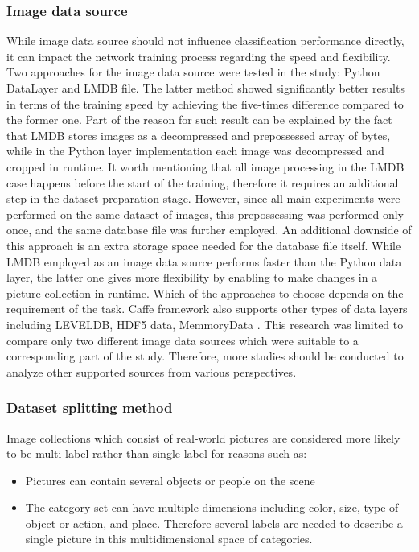 \subsubsection{Image data source}
While image data source should not influence classification performance directly, it can impact the network training process regarding the speed and flexibility. Two approaches for the image data source were tested in the study: Python DataLayer and LMDB file. The latter method showed significantly better results in terms of the training speed by achieving the five-times difference compared to the former one. Part of the reason for such result can be explained by the fact that LMDB stores images as a decompressed and prepossessed array of bytes, while in the Python layer implementation each image was decompressed and cropped in runtime. It worth mentioning that all image processing in the LMDB case happens before the start of the training, therefore it requires an additional step in the dataset preparation stage. However, since all main experiments were performed on the same dataset of images, this prepossessing was performed only once, and the same database file was further employed. An additional downside of this approach is an extra storage space needed for the database file itself. While LMDB employed as an image data source performs faster than the Python data layer, the latter one gives more flexibility by enabling to make changes in a picture collection in runtime. Which of the approaches to choose depends on the requirement of the task. Caffe framework also supports other types of data layers including LEVELDB, HDF5 data, MemmoryData \cite{CaffeLayerCatalogue}. This research was limited to compare only two different image data sources which were suitable to a corresponding part of the study. Therefore, more studies should be conducted to analyze other supported sources from various perspectives.

\subsubsection{Dataset splitting method}
Image collections which consist of real-world pictures are considered more likely to be multi-label rather than single-label for reasons such as:
\begin{itemize}
    \item Pictures can contain several objects or people on the scene
    \item The category set can have multiple dimensions including color, size, type of object or action, and place. Therefore several labels are needed to describe a single picture in this multidimensional space of categories.
\end{itemize}

